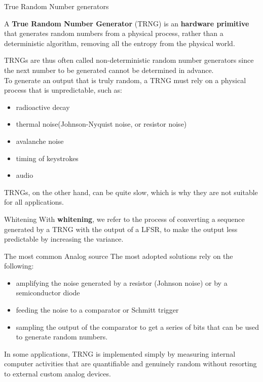 \begin{section}{True Random Number generators}
  \begin{boxH}
    A \textbf{True Random Number Generator} (TRNG) is an \textbf{hardware primitive} that generates
    random numbers from a physical process, rather than a deterministic algorithm, removing all the
    entropy from the physical world.
  \end{boxH}
  TRNGs are thus often called non-deterministic random number generators since the next number to 
  be generated cannot be determined in advance.\\
  To generate an output that is truly random, a TRNG must rely on a physical process that is
  unpredictable, such as:
  \begin{itemize}
    \item radioactive decay
    \item thermal noise(Johnson-Nyquist noise, or resistor noise)
    \item avalanche noise
    \item timing of keystrokes
    \item audio
  \end{itemize}
  TRNGs, on the other hand, can be quite slow, which is why they are not suitable for all
  applications.
  \begin{paragraph}{Whitening}
    With \textbf{whitening}, we refer to the process of converting a sequence generated by a TRNG
    with the output of a LFSR, to make the output less predictable by increasing the variance.
  \end{paragraph}
  \begin{paragraph}{The most common Analog source}
    The most adopted solutions rely on the following:
    \begin{itemize}
      \item amplifying the noise generated by a resistor (Johnson noise) or by a semiconductor diode
      \item feeding the noise to a comparator or Schmitt trigger
      \item sampling the output of the comparator to get a series of bits that can be used to
        generate random numbers.
    \end{itemize}
  \end{paragraph}
  In some applications, TRNG is implemented simply by measuring internal computer activities that are quantifiable and genuinely random without
  resorting to external custom analog devices.
  \begin{figure}

\end{figure}
\end{section}
